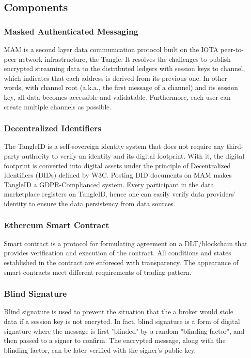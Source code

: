 \documentclass[journal,10pt,a4paper]{IEEEtran}
\begin{document}
\subsection{Components}
\subsubsection{Masked Authenticated Messaging}
MAM is a second layer data communication protocol built on the IOTA peer-to-peer network infrastructure, the Tangle. It resolves the challenges to publish encrypted streaming data to the distributed ledgers with session keys to channel, which indicates that each address is derived from its previous one. In other words, with channel root (a.k.a., the first message of a channel) and its session key, all data becomes accessible and validatable. Furthermore, each user can create multiple channels as possible.

\subsubsection{Decentralized Identifiers}
The TangleID\cite{TangleID} is a self-sovereign identity system that does not require any third-party authority to verify an identity and its digital footprint. With it, the digital footprint is converted into digital assets under the principle of Decentralized Identifiers (DIDs)\cite{DID} defined by W3C. Posting DID documents on MAM makes TangleID a GDPR-Complianced system\cite{GDPR}. Every participant in the data marketplace registers on TangleID, hence one can easily verify data providers' identity to ensure the data persistency from data sources.

\subsubsection{Ethereum Smart Contract}
Smart contract is a protocol for formulating agreement on a DLT/blockchain that provides verification and execution of the contract. All conditions and states established in the contract are enforeced with transparency. The appearance of smart contracts meet different requirements of trading pattern.

\subsubsection{Blind Signature}
Blind signature\cite{blindSig} is used to prevent the situation that the a broker would stole data if a session key is not encryted. In fact, blind signature is a form of digital signature where the message is first "blinded" by a random "blinding factor", and then passed to a signer to confirm. The encrypted message, along with the blinding factor, can be later verified with the signer's public key.
\end{document}
